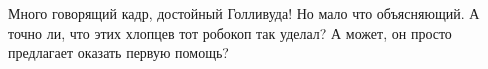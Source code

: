  
 
 
 
 


Много говорящий кадр, достойный Голливуда! Но мало что объясняющий. А точно ли,
что этих хлопцев тот робокоп так уделал? А может, он просто предлагает оказать
первую помощь?

